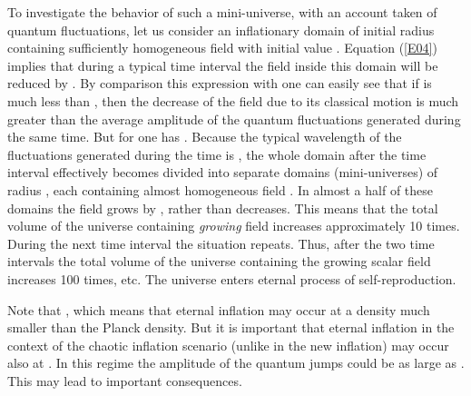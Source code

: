 \documentclass[a4paper,12pt]{article}
\begin{document}
To investigate the behavior of such a mini-universe, with an account
taken of quantum fluctuations, let us consider an inflationary domain of
initial radius \coordHE{} containing sufficiently homogeneous field with
initial value \coordHE{}. Equation (\ref{E04}) implies that during a
typical time interval \coordHE{} the field inside this domain will
be reduced by \coordHE{}. By comparison this
expression with \coordHE{}  one can easily see that if
\myHighlight{$\phi$}\coordHE{} is much less than \coordHE{},
 then the decrease of the field \myHighlight{$\phi$}\coordHE{}
due to its classical motion is much greater than the average amplitude of
the quantum fluctuations \myHighlight{$\delta\phi$}\coordHE{} generated during the same time. But
for   \myHighlight{$\phi \gg \phi^*$}\coordHE{} one has   \coordHE{}.
Because the typical wavelength of the fluctuations \coordHE{}
generated during the time is \coordHE{}, the whole domain after the time interval \coordHE{} effectively becomes divided into \coordHE{} separate domains
(mini-universes) of radius \coordHE{}, each containing almost homogeneous
field \myHighlight{$\phi - \Delta\phi+\delta\phi$}\coordHE{}.   In almost a half of these domains
the field \myHighlight{$\phi$}\coordHE{} grows by \coordHE{}, rather than decreases. This means that the total volume
of the universe containing {\it growing} field \myHighlight{$\phi$}\coordHE{} increases approximately 10 times. During the next time interval \coordHE{} the situation repeats.
Thus, after the two time  intervals \coordHE{} the total volume of the
universe containing the growing scalar field increases 100 times, etc.
The universe enters eternal process of self-reproduction.
 




Note that   \coordHE{}, which means that eternal inflation may occur at a density much smaller than the Planck density. But it is important that eternal inflation in the context of the chaotic inflation scenario  (unlike in the new inflation) may occur also at \coordHE{}. In this regime  the amplitude of the quantum jumps \coordHE{}  could be as large as \coordHE{}. This may lead to important consequences.
\end{document}
